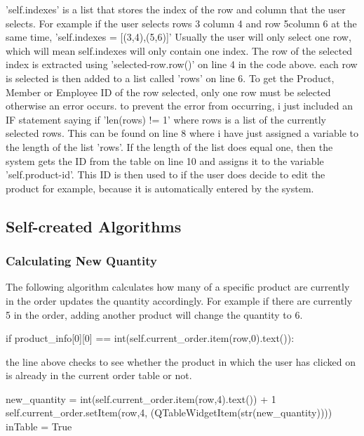 'self.indexes' is a list that stores the index of the row and column that the user selects. For example if the user selects rows 3 column 4 and row 5column 6 at the same time, 'self.indexes = [(3,4),(5,6)]' Usually the user will only select one row, which will mean self.indexes will only contain one index. The row of the selected index is extracted using 'selected-row.row()' on line 4 in the code above. each row is selected is then added to a list called 'rows' on line 6. To get the Product, Member or Employee ID of the row selected, only one row must be selected otherwise an error occurs. to prevent the error from occurring, i just included an IF statement saying if 'len(rows) != 1' where rows is a list of the currently selected rows. This can be found on line 8 where i have just assigned a variable to the length of the list 'rows'. If the length of the list does equal one, then the system gets the ID from the table on line 10 and assigns it to the variable 'self.product-id'. This ID is then used to if the user does decide to edit the product for example, because it is automatically entered by the system.


\pagebreak

\subsection{Self-created Algorithms}

\subsubsection{Calculating New Quantity}

The following algorithm calculates how many of a specific product are currently in the order updates the quantity accordingly. For example if there are currently 5 in the order, adding another product will change the quantity to 6.


\begin{python}
if product_info[0][0] == int(self.current_order.item(row,0).text()):
\end{python}

the line above checks to see whether the product in which the user has clicked on is already in the current order table or not.

\begin{python}
new_quantity = int(self.current_order.item(row,4).text()) + 1
self.current_order.setItem(row,4, (QTableWidgetItem(str(new_quantity))))
inTable  = True
\end{python}

